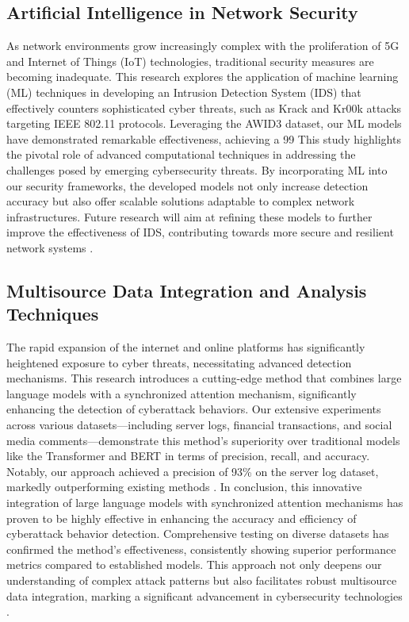 \subsection{Artificial Intelligence in Network Security}
As network environments grow increasingly complex with the proliferation of 5G and Internet of Things (IoT) technologies, traditional security measures are becoming inadequate. This research explores the application of machine learning (ML) techniques in developing an Intrusion Detection System (IDS) that effectively counters sophisticated cyber threats, such as Krack and Kr00k attacks targeting IEEE 802.11 protocols. Leveraging the AWID3 dataset, our ML models have demonstrated remarkable effectiveness, achieving a 99%
This study highlights the pivotal role of advanced computational techniques in addressing the challenges posed by emerging cybersecurity threats. By incorporating ML into our security frameworks, the developed models not only increase detection accuracy but also offer scalable solutions adaptable to complex network infrastructures. Future research will aim at refining these models to further improve the effectiveness of IDS, contributing towards more secure and resilient network systems \cite{10,11}.

\subsection{Multisource Data Integration and Analysis Techniques}
The rapid expansion of the internet and online platforms has significantly heightened exposure to cyber threats, necessitating advanced detection mechanisms. This research introduces a cutting-edge method that combines large language models with a synchronized attention mechanism, significantly enhancing the detection of cyberattack behaviors. Our extensive experiments across various datasets—including server logs, financial transactions, and social media comments—demonstrate this method's superiority over traditional models like the Transformer and BERT in terms of precision, recall, and accuracy. Notably, our approach achieved a precision of 93\% on the server log dataset, markedly outperforming existing methods \cite{12,13,14}.
In conclusion, this innovative integration of large language models with synchronized attention mechanisms has proven to be highly effective in enhancing the accuracy and efficiency of cyberattack behavior detection. Comprehensive testing on diverse datasets has confirmed the method's effectiveness, consistently showing superior performance metrics compared to established models. This approach not only deepens our understanding of complex attack patterns but also facilitates robust multisource data integration, marking a significant advancement in cybersecurity technologies \cite{15,16,17}.

